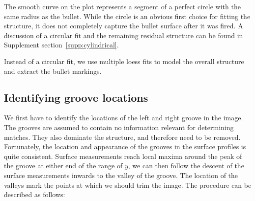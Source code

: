 \documentclass[aoas, preprint]{imsart}\usepackage[]{graphicx}\usepackage[]{color}
\begin{document}
The smooth curve on the plot represents a segment of a perfect circle with the same radius as the bullet. While the circle is an obvious first choice for fitting the structure, it does not completely capture the bullet surface after it was fired. A discussion of a circular fit and the remaining residual structure can be found in Supplement section~\ref{supp:cylindrical}.

Instead of a circular fit, we use multiple loess fits to model the overall structure and extract the bullet markings. 

\subsection{Identifying groove locations}
We first have to identify the locations of the left and right groove in the image. The grooves are assumed to contain no information relevant for determining matches. They also dominate the structure, and therefore need to be removed.  
Fortunately, the location and appearance of the grooves in the surface profiles is quite consistent.
Surface measurements reach local maxima around the peak of the groove at either end of the range of $y$, we can then follow the descent of the surface measurements inwards to the valley of the groove. 
The location of the valleys mark the points at which we should trim the image. The procedure can be described as follows:
\end{document}

